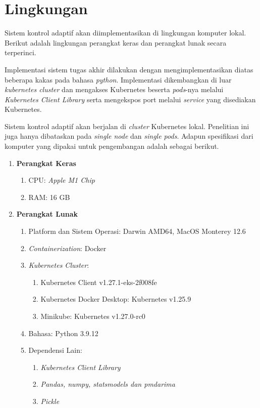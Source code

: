 \section{Lingkungan}

Sistem kontrol adaptif akan diimplementasikan di lingkungan komputer lokal. Berikut adalah lingkungan perangkat keras dan perangkat lunak secara terperinci.

Implementasi sistem tugas akhir dilakukan dengan mengimplementasikan diatas beberapa kakas pada bahasa \textit{python}. Implementasi dikembangkan di luar \textit{kubernetes cluster} dan mengakses Kubernetes beserta \textit{pods}-nya melalui \textit{Kubernetes Client Library} serta mengekspos port melalui \textit{service} yang disediakan Kubernetes. 

Sistem kontrol adaptif akan berjalan di \textit{cluster} Kubernetes lokal. Penelitian ini juga hanya dibataskan pada \textit{single node} dan \textit{single pods}. Adapun spesifikasi dari komputer yang dipakai untuk pengembangan adalah sebagai berikut.
\begin{enumerate}
    \item \textbf{Perangkat Keras}
    
        \begin{enumerate}
            \item CPU: \textit{Apple M1 Chip}
            \item RAM: 16 GB
        \end{enumerate}
    
    \item \textbf{Perangkat Lunak}
        
        \begin{enumerate}
            \item Platform dan Sistem Operasi: Darwin AMD64, MacOS Monterey 12.6
            \item \textit{Containerization}: Docker
            \item \textit{Kubernetes Cluster}:
                \begin{enumerate}
                    \item Kubernetes Client v1.27.1-eks-2f008fe
                    \item Kubernetes Docker Desktop: Kubernetes v1.25.9
                    \item Minikube: Kubernetes v1.27.0-rc0
                \end{enumerate}
            \item Bahasa: Python 3.9.12
            \item Dependensi Lain:
                \begin{enumerate}
                    \item \textit{Kubernetes Client Library}
                    \item \textit{Pandas, numpy, statsmodels dan pmdarima}
                    \item \textit{Pickle}
                \end{enumerate}
        \end{enumerate}
\end{enumerate}